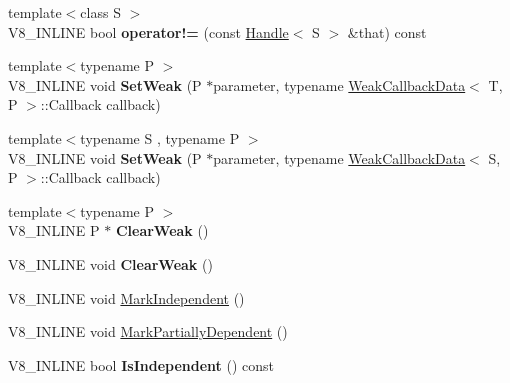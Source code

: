 \begin{DoxyCompactItemize}
\item 
\hypertarget{classv8_1_1_persistent_base_acc30195c1ee4e1f801cab267e6855fd3}{}{\footnotesize template$<$class S $>$ }\\V8\+\_\+\+I\+N\+L\+I\+N\+E bool {\bfseries operator!=} (const \hyperlink{classv8_1_1_handle}{Handle}$<$ S $>$ \&that) const \label{classv8_1_1_persistent_base_acc30195c1ee4e1f801cab267e6855fd3}

\item 
\hypertarget{classv8_1_1_persistent_base_a1fb3293eff7a66068de13d152f73f308}{}{\footnotesize template$<$typename P $>$ }\\V8\+\_\+\+I\+N\+L\+I\+N\+E void {\bfseries Set\+Weak} (P $\ast$parameter, typename \hyperlink{classv8_1_1_weak_callback_data}{Weak\+Callback\+Data}$<$ T, P $>$\+::Callback callback)\label{classv8_1_1_persistent_base_a1fb3293eff7a66068de13d152f73f308}

\item 
\hypertarget{classv8_1_1_persistent_base_a297e0c410e9496318187853e07bf8406}{}{\footnotesize template$<$typename S , typename P $>$ }\\V8\+\_\+\+I\+N\+L\+I\+N\+E void {\bfseries Set\+Weak} (P $\ast$parameter, typename \hyperlink{classv8_1_1_weak_callback_data}{Weak\+Callback\+Data}$<$ S, P $>$\+::Callback callback)\label{classv8_1_1_persistent_base_a297e0c410e9496318187853e07bf8406}

\item 
\hypertarget{classv8_1_1_persistent_base_a444d27c00650e3663348024df08cb121}{}{\footnotesize template$<$typename P $>$ }\\V8\+\_\+\+I\+N\+L\+I\+N\+E P $\ast$ {\bfseries Clear\+Weak} ()\label{classv8_1_1_persistent_base_a444d27c00650e3663348024df08cb121}

\item 
\hypertarget{classv8_1_1_persistent_base_afe515daead108cceb1699b54051df13b}{}V8\+\_\+\+I\+N\+L\+I\+N\+E void {\bfseries Clear\+Weak} ()\label{classv8_1_1_persistent_base_afe515daead108cceb1699b54051df13b}

\item 
V8\+\_\+\+I\+N\+L\+I\+N\+E void \hyperlink{classv8_1_1_persistent_base_aed12b0a54bc5ade1fb44e3bdb3a1fe74}{Mark\+Independent} ()
\item 
V8\+\_\+\+I\+N\+L\+I\+N\+E void \hyperlink{classv8_1_1_persistent_base_a4a876d30dda0dfb812e82bb240e4686e}{Mark\+Partially\+Dependent} ()
\item 
\hypertarget{classv8_1_1_persistent_base_a2ed93b6be1b27c299906935ef35d2114}{}V8\+\_\+\+I\+N\+L\+I\+N\+E bool {\bfseries Is\+Independent} () const \label{classv8_1_1_persistent_base_a2ed93b6be1b27c299906935ef35d2114}


\end{DoxyCompactItemize}
